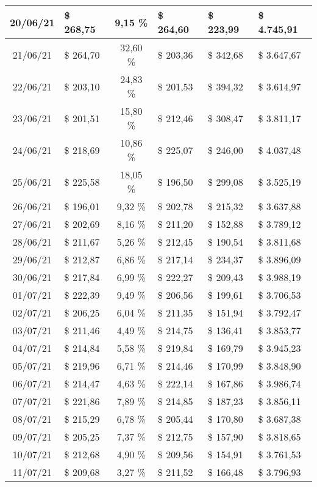 \begin{center}
\begin{small}
\begin{longtable}{|c|l|c|l|l|l|}
20/06/21 & \$ 268,75 & 9,15 \% & \$ 264,60 & \$ 223,99 & \$ 4.745,91 \\ \hline
21/06/21 & \$ 264,70 & 32,60 \% & \$ 203,36 & \$ 342,68 & \$ 3.647,67 \\ \hline
22/06/21 & \$ 203,10 & 24,83 \% & \$ 201,53 & \$ 394,32 & \$ 3.614,97 \\ \hline
23/06/21 & \$ 201,51 & 15,80 \% & \$ 212,46 & \$ 308,47 & \$ 3.811,17 \\ \hline
24/06/21 & \$ 218,69 & 10,86 \% & \$ 225,07 & \$ 246,00 & \$ 4.037,48 \\ \hline
25/06/21 & \$ 225,58 & 18,05 \% & \$ 196,50 & \$ 299,08 & \$ 3.525,19 \\ \hline
26/06/21 & \$ 196,01 & 9,32 \% & \$ 202,78 & \$ 215,32 & \$ 3.637,88 \\ \hline
27/06/21 & \$ 202,69 & 8,16 \% & \$ 211,20 & \$ 152,88 & \$ 3.789,12 \\ \hline
28/06/21 & \$ 211,67 & 5,26 \% & \$ 212,45 & \$ 190,54 & \$ 3.811,68 \\ \hline
29/06/21 & \$ 212,87 & 6,86 \% & \$ 217,14 & \$ 234,37 & \$ 3.896,09 \\ \hline
30/06/21 & \$ 217,84 & 6,99 \% & \$ 222,27 & \$ 209,43 & \$ 3.988,19 \\ \hline
01/07/21 & \$ 222,39 & 9,49 \% & \$ 206,56 & \$ 199,61 & \$ 3.706,53 \\ \hline
02/07/21 & \$ 206,25 & 6,04 \% & \$ 211,35 & \$ 151,94 & \$ 3.792,47 \\ \hline
03/07/21 & \$ 211,46 & 4,49 \% & \$ 214,75 & \$ 136,41 & \$ 3.853,77 \\ \hline
04/07/21 & \$ 214,84 & 5,58 \% & \$ 219,84 & \$ 169,79 & \$ 3.945,23 \\ \hline
05/07/21 & \$ 219,96 & 6,71 \% & \$ 214,46 & \$ 170,99 & \$ 3.848,90 \\ \hline
06/07/21 & \$ 214,47 & 4,63 \% & \$ 222,14 & \$ 167,86 & \$ 3.986,74 \\ \hline
07/07/21 & \$ 221,86 & 7,89 \% & \$ 214,85 & \$ 187,23 & \$ 3.856,11 \\ \hline
08/07/21 & \$ 215,29 & 6,78 \% & \$ 205,44 & \$ 170,80 & \$ 3.687,38 \\ \hline
09/07/21 & \$ 205,25 & 7,37 \% & \$ 212,75 & \$ 157,90 & \$ 3.818,65 \\ \hline
10/07/21 & \$ 212,68 & 4,90 \% & \$ 209,56 & \$ 154,91 & \$ 3.761,53 \\ \hline
11/07/21 & \$ 209,68 & 3,27 \% & \$ 211,52 & \$ 166,48 & \$ 3.796,93 \\ \hline

\end{longtable}
\end{small}
\end{center}

